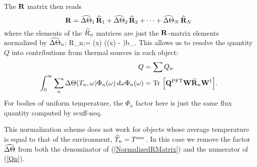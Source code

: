 \documentclass[letterpaper]{article}
\newcommand{\vbeps}{\boldsymbol{\epsilon}}
\begin{document}
The $\mathbf{R}$ matrix then reads
$$ \mathbf{R} = 
     \widehat{\Delta\Theta}_1 \, \widehat{\mathbf{R}}_1
    +\widehat{\Delta\Theta}_2 \, \widehat{\mathbf{R}}_2
    +\cdots
    +\widehat{\Delta\Theta}_N \, \widehat{\mathbf{R}}_N
$$
where the elements of the $\widehat{R}_n$ matrices are just the 
$\mathbf{R}$-matrix elements normalized by $\widehat{\Delta\Theta}_n$:
{
\wh R_{n;\alpha\beta}=
          { \Delta\Theta(\vb x) (\vbeps(\vb x) - )}{\vb b_\beta}.
}
This allows us to resolve the quantity $Q$ into contributions
from thermal sources in each object:
\begin{align*}
 Q&=\sum Q_n
\\
\int_0^\infty \sum_n \Delta\Theta(T_n,\omega)\Phi_n(\omega) \,d\omega
\label{Qn}
\Phi_n(\omega)
  &=\text{Tr }\Big[\mathbf{Q}^{\hbox{\scriptsize{PFT}}} \mathbf{W} \widehat{\mathbf{R}}_n \mathbf{W}^\dagger\Big].
\end{align*}
For bodies of uniform temperature, the $\Phi_n$ factor here is just
the same flux quantity computed by {\sc scuff-neq}. 

This normalization scheme does not work for objects whose average
temperature is equal to that of the environment, $\widehat T_n=T^{\hbox{\scriptsize{env}}}$.
In this case we remove the factor $\widehat{\Delta\Theta}$ from both
the denominator of (\ref{NormalizedRMatrix})
and the numerator of (\ref{Qn}).
\end{document}
